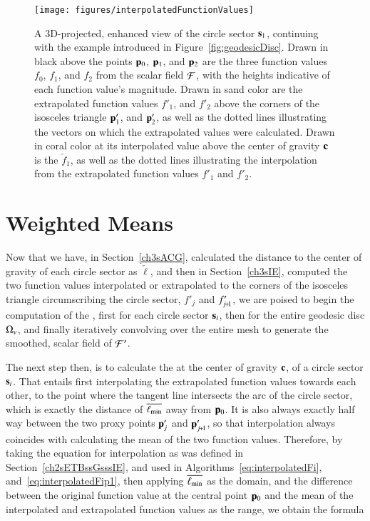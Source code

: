 \begin{figure}[ht]
\ffigbox
	{\texttt{[image: figures/interpolatedFunctionValues]}}
	{\caption[Interpolation of Function Values toward the Center of Gravity]{A 3D-projected, enhanced view of the circle sector $\mathbf{s}_1$, continuing with the example introduced in Figure~\ref{fig:geodesicDisc}. Drawn in black above the points $\mathbf{p}_0$, $\mathbf{p}_1$, and $\mathbf{p}_2$ are the three function values $f_0$, $f_1$, and $f_2$ from the scalar field $\mathcal{F}$, with the heights indicative of each function value's magnitude. Drawn in sand color are the extrapolated function values $f'_1$, and $f'_2$ above the corners of the isosceles triangle $\mathbf{p}'_1$, and $\mathbf{p}'_2$, as well as the dotted lines illustrating the vectors on which the extrapolated values were calculated. Drawn in coral color at its interpolated value above the center of gravity $\mathbf{c}$ is the \wmfv{} $\check{f}_1$, as well as the dotted lines illustrating the interpolation from the extrapolated function values $f'_1$ and $f'_2$.}\label{fig:interpolatedFunctionValues}}
\end{figure}

%
%
%
%
\section{Weighted Means}
\label{ch3sWM}
Now that we have, in Section~\ref{ch3sACG}, calculated the distance to the center of gravity of each circle sector as $\check{\ell}$, and then in Section~\ref{ch3sIE}, computed the two function values interpolated or extrapolated to the corners of the isosceles triangle circumscribing the circle sector, $f'_j$ and $f'_{\sjpo}$, we are poised to begin the computation of the , first for each circle sector $\mathbf{s}_i$, then for the entire geodesic disc $\Omega_v$, and finally iteratively convolving  over the entire mesh to generate the smoothed, scalar field of  $\mathcal{F}'$.

The next step then, is to calculate the \wmfv{} at the center of gravity $\mathbf{c}$, of a circle sector $\mathbf{s}_i$. That entails first interpolating the extrapolated function values towards each other, to the point where the tangent line intersects the arc of the circle sector, which is exactly the distance of $\overline{\ell_\text{min}}$ away from $\mathbf{p}_0$. It is also always exactly half way between the two proxy points $\mathbf{p}'_j$ and $\bp'_{\sjpo}$, so that interpolation always coincides with calculating the mean of the two function values. Therefore, by taking the equation for interpolation as was defined in Section~\ref{ch2sETBssGsssIE}, and used in Algorithms~\ref{eq:interpolatedFi}, and~\ref{eq:interpolatedFip1}, then applying $\overline{\ell_\text{min}}$ as the domain, and the difference between the original function value at the central point $\mathbf{p}_0$ and the mean of the interpolated and extrapolated function values as the range, we obtain the formula
\vspace*{\baselineskip}

